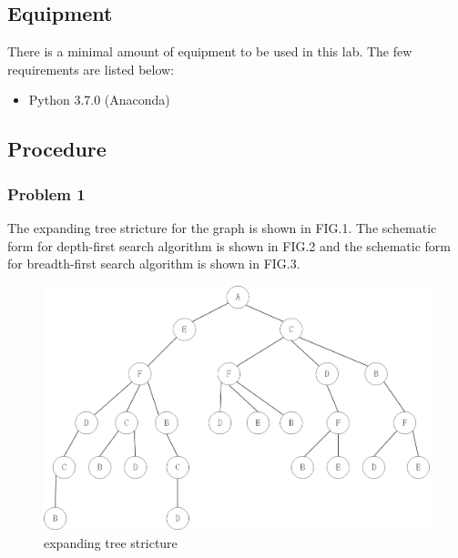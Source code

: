 \documentclass[aps,letterpaper,10pt]{revtex4}
\begin{document}
\vspace{3mm} %


\subsection{Equipment}
There is a minimal amount of equipment to be used in this lab.  The few requirements are listed below:
	\begin{itemize}
		\item Python 3.7.0 (Anaconda)
	\end{itemize}

\subsection{Procedure}
\subsubsection{Problem 1}
The expanding tree stricture for the graph is shown in FIG.1. The schematic form for depth-first search algorithm is shown in FIG.2 and 
the schematic form for breadth-first search algorithm is shown in FIG.3.

\begin{figure}[h]
	\centering
	\includegraphics[scale=0.6]{Q1_visual_Tree.png}
	\caption{expanding tree stricture}
	\label{fig:label}
\end{figure}
\end{document}
